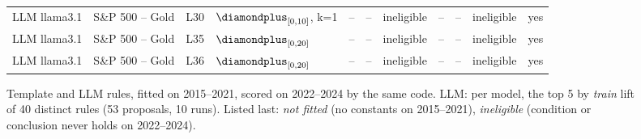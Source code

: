 \begin{figure}[t]
{\begin{tabular}{llllrrrrrll}
LLM llama3.1 & S\&P 500 -- Gold & L30 & $\diamondplus_{[0,10]}$, k=1 & -- & -- & ineligible & -- & -- & ineligible & yes \\
LLM llama3.1 & S\&P 500 -- Gold & L35 & $\diamondplus_{[0,20]}$ & -- & -- & ineligible & -- & -- & ineligible & yes \\
LLM llama3.1 & S\&P 500 -- Gold & L36 & $\diamondplus_{[0,20]}$ & -- & -- & ineligible & -- & -- & ineligible & yes \\
\bottomrule
\end{tabular}
}
\caption{\small{Template and LLM rules, fitted on 2015--2021, scored on 2022--2024 by the same code. LLM: per model, the top 5 by \emph{train} lift of 40 distinct rules (53 proposals, 10 runs). Listed last: \emph{not fitted} (no constants on 2015--2021), \emph{ineligible} (condition or conclusion never holds on 2022--2024).}}
\label{fig:rule-comparison-pub}
\end{figure}
